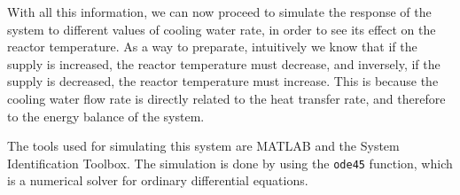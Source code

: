 With all this information, we can now proceed to simulate the response of the system to different values of cooling water rate, in order to see its effect on the reactor temperature. As a way to preparate, intuitively we know that if the supply is increased, the reactor temperature must decrease, and inversely, if the supply is decreased, the reactor temperature must increase. This is because the cooling water flow rate is directly related to the heat transfer rate, and therefore to the energy balance of the system.

The tools used for simulating this system are MATLAB and the System Identification Toolbox. The simulation is done by using the \texttt{ode45} function, which is a numerical solver for ordinary differential equations.
